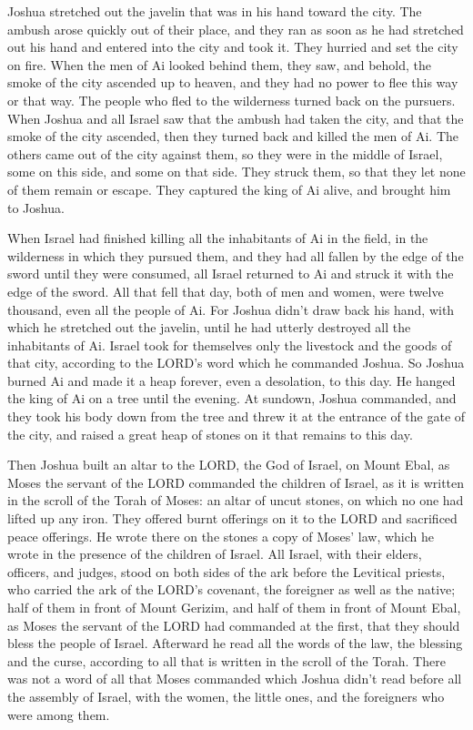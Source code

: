 Joshua stretched out the javelin that was in his hand toward the city.
\myverse{}The ambush arose quickly out of their place, and they ran as soon as he had
stretched out his hand and entered into the city and took it. They hurried and set the city on fire.
\myverse{}When the men of Ai looked behind them, they saw, and behold, the smoke of
the city ascended up to heaven, and they had no power to flee this way or that way. The people who fled
to the wilderness turned back on the pursuers.
\myverse{}When Joshua and all Israel saw that the ambush had taken the city, and that
the smoke of the city ascended, then they turned back and killed the men of Ai.
\myverse{}The others came out of the city against them, so they were in the middle of
Israel, some on this side, and some on that side. They struck them, so that they let none of them remain
or escape.
\myverse{}They captured the king of Ai alive, and brought him to Joshua.

\myverse{}When Israel had finished killing all the inhabitants of Ai in
the field, in the wilderness in which they pursued them, and they had all fallen by the edge of the sword
until they were consumed, all Israel returned to Ai and struck it with the edge of the sword.
\myverse{}All that fell that day, both of men and women, were twelve thousand, even
all the people of Ai.
\myverse{}For Joshua didn’t draw back his hand, with which he stretched out the javelin,
until he had utterly destroyed all the inhabitants of Ai.
\myverse{}Israel took for themselves only the livestock and the goods of that city,
according to the LORD’s word which he commanded Joshua.
\myverse{}So Joshua burned Ai and made it a heap forever, even a desolation, to this
day.
\myverse{}He hanged the king of Ai on a tree until the evening. At sundown, Joshua commanded,
and they took his body down from the tree and threw it at the entrance of the gate of the city, and raised
a great heap of stones on it that remains to this day.

\myverse{}Then Joshua built an altar to the LORD, the God of Israel, on
Mount Ebal,
\myverse{}as Moses the servant of the LORD commanded the children of Israel, as it is
written in the scroll of the Torah of Moses: an altar of uncut stones, on which no one had lifted up any
iron. They offered burnt offerings on it to the LORD and sacrificed peace offerings.
\myverse{}He wrote there on the stones a copy of Moses’ law, which he wrote in the presence
of the children of Israel.
\myverse{}All Israel, with their elders, officers, and judges, stood on both sides of
the ark before the Levitical priests, who carried the ark of the LORD’s covenant, the foreigner as well
as the native; half of them in front of Mount Gerizim, and half of them in front of Mount Ebal, as Moses
the servant of the LORD had commanded at the first, that they should bless the people of Israel.
\myverse{}Afterward he read all the words of the law, the blessing and the curse, according
to all that is written in the scroll of the Torah.
\myverse{}There was not a word of all that Moses commanded which Joshua didn’t read
before all the assembly of Israel, with the women, the little ones, and the foreigners who were among
them.


